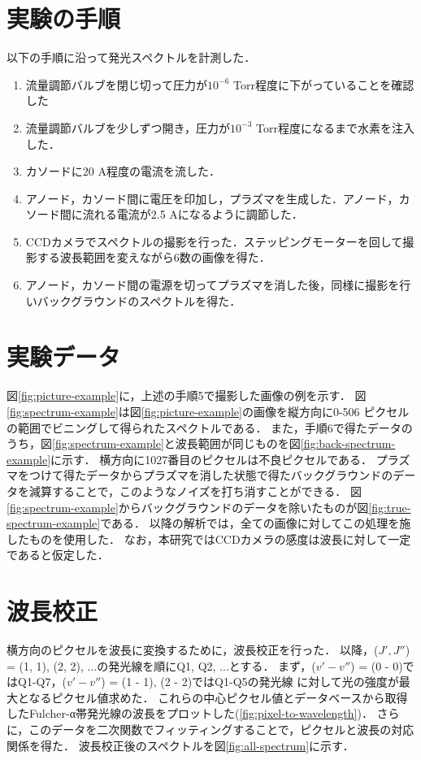 \section{実験の手順}
以下の手順に沿って発光スペクトルを計測した．
\begin{enumerate}
    \item 流量調節バルブを閉じ切って圧力が$10^{-6}$ Torr程度に下がっていることを確認した
    \item 流量調節バルブを少しずつ開き，圧力が$10^{-3}$ Torr程度になるまで水素を注入した．
    \item カソードに20 A程度の電流を流した．
    \item アノード，カソード間に電圧を印加し，プラズマを生成した．アノード，カソード間に流れる電流が2.5 Aになるように調節した．
    \item CCDカメラでスペクトルの撮影を行った．ステッピングモーターを回して撮影する波長範囲を変えながら6数の画像を得た．
    \item アノード，カソード間の電源を切ってプラズマを消した後，同様に撮影を行いバックグラウンドのスペクトルを得た．
\end{enumerate}

\section{実験データ}
図\ref{fig:picture-example}に，上述の手順5で撮影した画像の例を示す．
図\ref{fig:spectrum-example}は図\ref{fig:picture-example}の画像を縦方向に0-506 ピクセルの範囲でビニングして得られたスペクトルである．
また，手順6で得たデータのうち，図\ref{fig:spectrum-example}と波長範囲が同じものを図\ref{fig:back-spectrum-example}に示す．
横方向に1027番目のピクセルは不良ピクセルである．
プラズマをつけて得たデータからプラズマを消した状態で得たバックグラウンドのデータを減算することで，このようなノイズを打ち消すことができる．
図\ref{fig:spectrum-example}からバックグラウンドのデータを除いたものが図\ref{fig:true-spectrum-example}である．
以降の解析では，全ての画像に対してこの処理を施したものを使用した．
なお，本研究ではCCDカメラの感度は波長に対して一定であると仮定した．

\section{波長校正}
横方向のピクセルを波長に変換するために，波長校正を行った．
以降，($J', J''$) = (1, 1), (2, 2), ...の発光線を順にQ1, Q2, ...とする．
まず，($v'-v''$) = (0 - 0)ではQ1-Q7，($v'-v''$) = (1 - 1), (2 - 2)ではQ1-Q5の発光線
に対して光の強度が最大となるピクセル値求めた．
これらの中心ピクセル値とデータベース\cite{H2-spectrum-data}から取得したFulcher-α帯発光線の波長をプロットした(\ref{fig:pixel-to-wavelength})．
さらに，このデータを二次関数でフィッティングすることで，ピクセルと波長の対応関係を得た．
波長校正後のスペクトルを図\ref{fig:all-spectrum}に示す．
